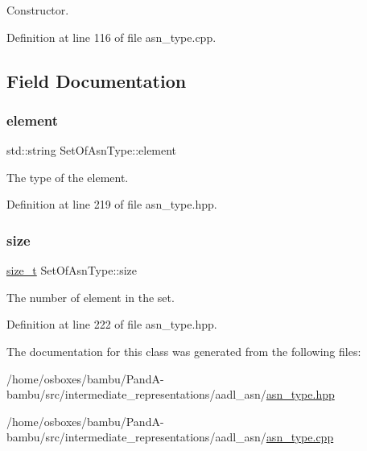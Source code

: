 Constructor. 



Definition at line 116 of file asn\+\_\+type.\+cpp.



\subsection{Field Documentation}
\mbox{\label{classSetOfAsnType_a615627490388391643a0ca1b70a46ecb}} 
\subsubsection{\texorpdfstring{element}{element}}
{\footnotesize\ttfamily std\+::string Set\+Of\+Asn\+Type\+::element}



The type of the element. 



Definition at line 219 of file asn\+\_\+type.\+hpp.

\mbox{\label{classSetOfAsnType_a497aa01dd40b76c0e2d74e7b73727916}} 
\subsubsection{\texorpdfstring{size}{size}}
{\footnotesize\ttfamily \hyperlink{tutorial__fpt__2017_2intro_2sixth_2test_8c_a7c94ea6f8948649f8d181ae55911eeaf}{size\+\_\+t} Set\+Of\+Asn\+Type\+::size}



The number of element in the set. 



Definition at line 222 of file asn\+\_\+type.\+hpp.



The documentation for this class was generated from the following files\+:\begin{DoxyCompactItemize}
\item 
/home/osboxes/bambu/\+Pand\+A-\/bambu/src/intermediate\+\_\+representations/aadl\+\_\+asn/\hyperlink{asn__type_8hpp}{asn\+\_\+type.\+hpp}\item 
/home/osboxes/bambu/\+Pand\+A-\/bambu/src/intermediate\+\_\+representations/aadl\+\_\+asn/\hyperlink{asn__type_8cpp}{asn\+\_\+type.\+cpp}\end{DoxyCompactItemize}
